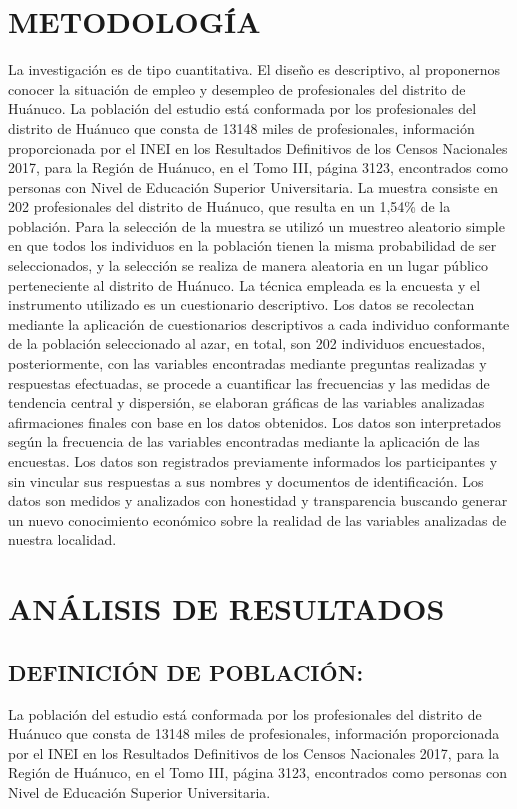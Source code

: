\documentclass[12pt, a4paper]{article}
\begin{document}
\section{METODOLOGÍA}
La investigación es de tipo cuantitativa. El diseño es descriptivo, al proponernos conocer la situación de empleo y desempleo de profesionales del distrito de Huánuco. La población del estudio está conformada por los profesionales del distrito de Huánuco que consta de 13148 miles de profesionales, información proporcionada por el INEI en los Resultados Definitivos de los Censos Nacionales 2017, para la Región de Huánuco, en el Tomo III, página 3123, encontrados como personas con Nivel de Educación Superior Universitaria. La muestra consiste en 202 profesionales del distrito de Huánuco, que resulta en un 1,54\% de la población. Para la selección de la muestra se utilizó un muestreo aleatorio simple en que todos los individuos en la población tienen la misma probabilidad de ser seleccionados, y la selección se realiza de manera aleatoria en un lugar público perteneciente al distrito de Huánuco.  La técnica empleada es la encuesta y el instrumento utilizado es un cuestionario descriptivo. Los datos se recolectan mediante la aplicación de cuestionarios descriptivos a cada individuo conformante de la población seleccionado al azar, en total, son 202 individuos encuestados, posteriormente, con las variables encontradas mediante preguntas realizadas y respuestas efectuadas, se procede a cuantificar las frecuencias y las medidas de tendencia central y dispersión, se elaboran gráficas de las variables analizadas afirmaciones finales con base en los datos obtenidos. Los datos son interpretados según la frecuencia de las variables encontradas mediante la aplicación de las encuestas. Los datos son registrados previamente informados los participantes y sin vincular sus respuestas a sus nombres y documentos de identificación. Los datos son medidos y analizados con honestidad y transparencia buscando generar un nuevo conocimiento económico sobre la realidad de las variables analizadas de nuestra localidad.


\section{ANÁLISIS DE RESULTADOS}
\subsection{DEFINICIÓN DE POBLACIÓN:}
La población del estudio está conformada por los profesionales del distrito de Huánuco que consta de 13148 miles de profesionales, información proporcionada por el INEI en los Resultados Definitivos de los Censos Nacionales 2017, para la Región de Huánuco, en el Tomo III, página 3123, encontrados como personas con Nivel de Educación Superior Universitaria.
\end{document}
